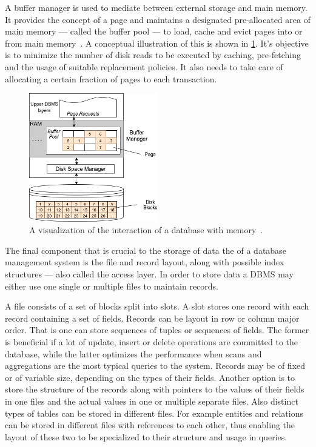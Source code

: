     A buffer manager is used to mediate between external storage and main memory. 
    It provides the concept of a page and maintains a designated pre-allocated area of main memory --- called the buffer pool --- to load, cache and evict pages into or from main memory~\autocite{ramakrishnan2000database}.
    A conceptual illustration of this is shown in \ref{buf-man}.
    It's objective is to minimize the number of disk reads to be executed by caching, pre-fetching and the usage of suitable replacement policies. 
    It also needs to take care of allocating a certain fraction of pages to each transaction.

    \begin{figure}[htp]\label{dbms_memory}
        \begin{center}
        \includegraphics[keepaspectratio,height=0.4\textheight,width=0.5\textwidth]{img/04-databases/RDBMS_memory_view.png}
        \end{center}
        \caption{A visualization of the interaction of a database with memory~\autocite{ramakrishnan2000database}.}
        \label{buf-man}
    \end{figure}

    The final component that is crucial to the storage of data the  of a database management system is the file and record layout, along with possible index structures --- also called the access layer. 
    In order to store data a DBMS may either use one single or multiple files to maintain records. 

    A file consists of a set of blocks split into slots.
    A slot stores one record with each record containing a set of fields.
    Records can be layout in row or column major order.
    That is one can store sequences of tuples or sequences of fields.
    The former is beneficial if a lot of update, insert or delete operations are committed to the database, while the latter optimizes the performance when scans and aggregations are the most typical queries to the system.
    Records may be of fixed or of variable size, depending on the types of their fields. 
    Another option is to store the structure of the records along with pointers to the values of their fields in one files and the actual values in one or multiple separate files. 
    Also distinct types of tables can be stored in different files. 
    For example entities and relations can be stored in different files with references to each other, thus enabling the layout of these two to be specialized to their structure and usage in queries.

